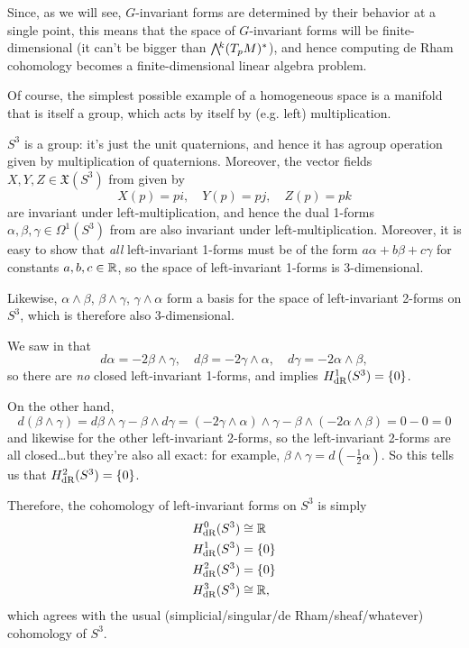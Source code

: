 Since, as we will see, $G$-invariant forms are determined by their behavior at a single point, this means that the space of $G$-invariant forms will be finite-dimensional (it can't be bigger than $\ext{k} (T_pM)^\ast$), and hence computing de Rham cohomology becomes a finite-dimensional linear algebra problem.

Of course, the simplest possible example of a homogeneous space is a manifold that is itself a group, which acts by itself by (e.g. left) multiplication.

\begin{example}
	$S^3$ is a group: it's just the unit quaternions, and hence it has agroup operation given by multiplication of quaternions. Moreover, the vector fields $X,Y,Z \in \mathfrak{X}(S^3)$ from  given by
	\[
		X(p) = pi, \quad Y(p) = pj, \quad Z(p) = pk
	\]
	are invariant under left-multiplication, and hence the dual 1-forms $\alpha, \beta, \gamma \in \Omega^1(S^3)$ from  are also invariant under left-multiplication. Moreover, it is easy to show that \emph{all} left-invariant 1-forms must be of the form $a \alpha + b \beta + c \gamma$ for constants $a,b,c \in \mathbb{R}$, so the space of left-invariant 1-forms is 3-dimensional.
	
	Likewise, $\alpha \wedge \beta$, $\beta \wedge \gamma$, $\gamma \wedge \alpha$ form a basis for the space of left-invariant 2-forms on $S^3$, which is therefore also 3-dimensional.
	
	We saw in  that 
	\[
		d\alpha = -2 \beta \wedge \gamma, \quad d \beta = -2\gamma \wedge \alpha, \quad d\gamma = -2 \alpha \wedge \beta,
	\]
	so there are \emph{no} closed left-invariant 1-forms, and  implies $H_{\text{dR}}^1(S^3) = \{0\}$.
	
	On the other hand,
	\[
		d(\beta \wedge \gamma) = d\beta \wedge \gamma - \beta \wedge d\gamma = (-2 \gamma \wedge \alpha) \wedge \gamma - \beta \wedge (-2\alpha \wedge \beta) = 0-0=0
	\]
	and likewise for the other left-invariant 2-forms, so the left-invariant 2-forms are all closed…but they're also all exact: for example, $\beta \wedge \gamma = d\left(-\frac{1}{2}\alpha\right)$. So this tells us that $H_{\text{dR}}^2(S^3) = \{0\}$.
	
	Therefore, the cohomology of left-invariant forms on $S^3$ is simply
	\begin{align*}
		H_{\text{dR}}^0(S^3) & \cong \mathbb{R} \\
		H_{\text{dR}}^1(S^3) & =\{0\} \\
		H_{\text{dR}}^2(S^3) & =\{0\} \\
		H_{\text{dR}}^3(S^3) & \cong \mathbb{R} ,
	\end{align*}
	which agrees with the usual (simplicial/singular/de Rham/sheaf/whatever) cohomology of $S^3$.
\end{example}

